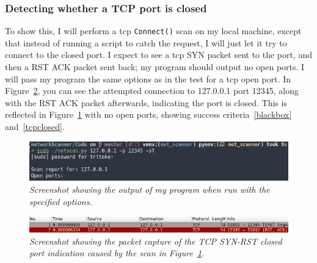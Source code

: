 \documentclass[titlepage]{article}
\let\Oldsubsubsection\subsubsection{}
\renewcommand{\subsubsection}{\FloatBarrier\Oldsubsubsection}
\begin{document}
\subsubsection{Detecting whether a TCP port is closed}
To show this, I will perform a \gls{tcp} \verb|Connect()| scan
on my local machine, except that instead of running a script to catch the
request, I will just let it try to connect to the closed port.
I expect to see a \gls{tcp} SYN packet sent to the port, and then a RST ACK
packet sent back; my program should output no open ports.
I will pass my program the same options as in the test for
a \gls{tcp} open port.
In Figure~\ref{tcpclosedpcap}, you can see the attempted connection to
127.0.0.1 port 12345, along with the RST ACK packet afterwards, indicating
the port is closed. This is reflected in Figure~\ref{tcpclosedoutput}
with no open ports, showing success criteria~\ref{blackbox} and~\ref{tcpclosed}.
\begin{figure}[H]
  \centering
  \includegraphics[width=\textwidth]{tcpclosedoutput.png}
  \caption{\textit{%
    Screenshot showing the output of my program when run with the specified options.
}}\label{tcpclosedoutput}
\end{figure}

\begin{figure}[H]
  \centering
  \includegraphics[width=\textwidth]{tcpclosedpcap.png}
  \caption{\textit{%
    Screenshot showing the packet capture of the TCP SYN-RST closed port indication
    caused by the scan in Figure~\ref{tcpclosedoutput}.
}}\label{tcpclosedpcap}
\end{figure}
\end{document}

